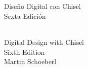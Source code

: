 \documentclass[%
    10pt,
    headinclude, footinclude=false,
    openright, %
    notitlepage,
    cleardoublepage=empty,
    headsepline,
    numbers=noenddot,
    bibliography=totoc, index=totoc,
    ]{scrbook}
\newif\ifbook
\begin{document}
\ifbook
\else

\newpage
\thispagestyle{empty}
~
\newpage
\fi



\begin{flushleft}
\pagestyle{empty}
\ \\
\vspace{1cm}
{\mdseries\huge Diseño Digital con Chisel}
\ \\
\vspace{1cm}
{\mdseries\Large Sexta Edición}
\cleardoublepage
\end{flushleft}
\newpage


\begin{flushleft}
\pagestyle{empty}
\ \\
\vspace{1cm}
{\Huge Digital Design with Chisel\\
\bigskip
{\huge Sixth Edition}\\
\bigskip
\bigskip
\bigskip
\bigskip
\bigskip
{\huge Martin Schoeberl}
\medskip\\

}

\newpage
\end{flushleft}
\end{document}
